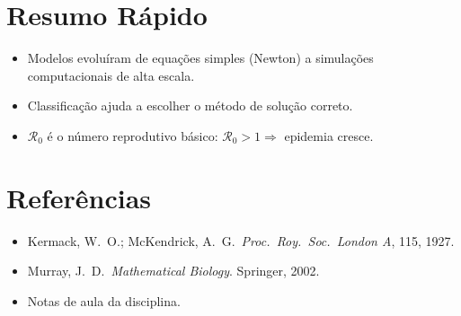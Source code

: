 \documentclass[12pt,a4paper]{article}
\begin{document}
\section*{Resumo R\'apido}
\begin{itemize}
  \item Modelos evolu\'iram de equa\c{c}\~oes simples (Newton) a simula\c{c}\~oes computacionais de alta escala.
  \item Classifica\c{c}\~ao ajuda a escolher o m\'etodo de solu\c{c}\~ao correto.
  \item $\mathcal{R}_0$ \'e o n\'umero reprodutivo b\'asico: $\mathcal{R}_0 > 1 \Rightarrow$ epidemia cresce.
\end{itemize}

\section*{Refer\^encias}
\begin{itemize}
  \item Kermack, W.\ O.; McKendrick, A.\ G.\ \textit{Proc.\ Roy.\ Soc.\ London A}, 115, 1927.
  \item Murray, J.\ D.\ \textit{Mathematical Biology}. Springer, 2002.
  \item Notas de aula da disciplina.
\end{itemize}
\end{document}
